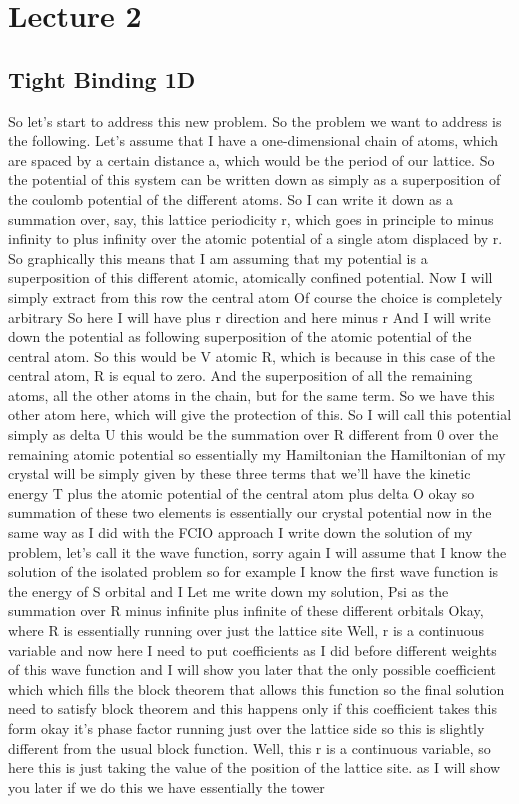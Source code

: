 \chapter{Lecture 2}
\section{Tight Binding 1D}
So let's start to address this new problem. So the problem we want to address is the following. Let's assume that I have a one-dimensional chain of atoms, which are spaced by a certain distance a, which would be the period of our lattice. So the potential of this system can be written down as simply as a superposition of the coulomb potential of the different atoms. So I can write it down as a summation over, say, this lattice periodicity r, which goes in principle to minus infinity to plus infinity over the atomic potential of a single atom displaced by r. So graphically this means that I am assuming that my potential is a superposition of this different atomic, atomically confined potential. Now I will simply extract from this row the central atom Of course the choice is completely arbitrary So here I will have plus r direction and here minus r And I will write down the potential as following superposition of the atomic potential of the central atom. So this would be V atomic R, which is because in this case of the central atom, R is equal to zero. And the superposition of all the remaining atoms, all the other atoms in the chain, but for the same term. So we have this other atom here, which will give the protection of this. So I will call this potential simply as delta U this would be the summation over R different from 0 over the remaining atomic potential so essentially my Hamiltonian the Hamiltonian of my crystal will be simply given by these three terms that we'll have the kinetic energy T plus the atomic potential of the central atom plus delta O okay so summation of these two elements is essentially our crystal potential now in the same way as I did with the FCIO approach I write down the solution of my problem, let's call it the wave function, sorry again I will assume that I know the solution of the isolated problem so for example I know the first wave function is the energy of S orbital and I Let me write down my solution, Psi as the summation over R minus infinite plus infinite of these different orbitals Okay, where R is essentially running over just the lattice site Well, r is a continuous variable and now here I need to put coefficients as I did before different weights of this wave function and I will show you later that the only possible coefficient which which fills the block theorem that allows this function so the final solution need to satisfy block theorem and this happens only if this coefficient takes this form okay it's phase factor running just over the lattice side so this is slightly different from the usual block function. Well, this r is a continuous variable, so here this is just taking the value of the position of the lattice site. as I will show you later if we do this we have essentially the tower 
